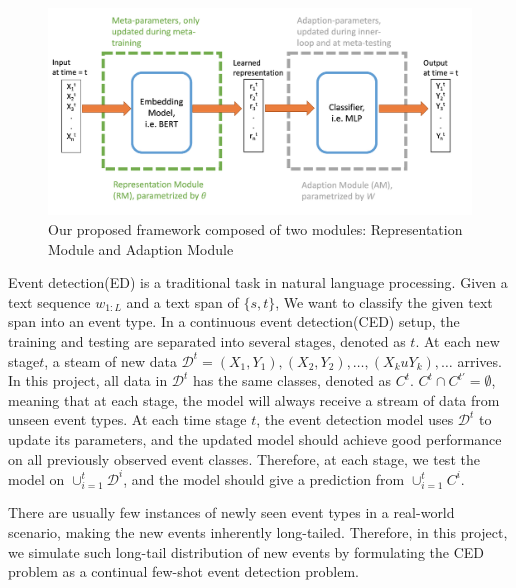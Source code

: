 
\begin{figure}[ht]
\centering
    \includegraphics[scale=0.6]{imgs/framework.jpg}
    \caption{Our proposed framework composed of two modules: Representation Module and Adaption Module}
    \label{img:1}
\end{figure}

Event detection(ED) is a traditional task in natural language processing. Given a text sequence $w_{1:L}$ and a text span of $\{s, t\}$, We want to classify the given text span into an event type.  In a continuous event detection(CED) setup, the training and testing are separated into several stages, denoted as $t$. At each new stage$t$,   a steam of new data $\mathcal{D}^t = (X_1, Y_1), (X_2, Y_2), \dots, (X_ku Y_k), \dots$ arrives.  In this project, all data in $\mathcal{D}^t $ has the same classes, denoted as $C^{t}$.  $C^t \cap C^{t'}  = \emptyset$, meaning that at each stage,  the model will always receive a stream of data from unseen event types.  At each time stage $t$, the event detection model uses $\mathcal{D}^t $ to update its parameters, and the updated model should achieve good performance on all previously observed event classes.  Therefore, at each stage, we test the model on $\cup_{i=1}^t \mathcal{D}^i$, and the model should give a prediction from  $\cup_{i=1}^t C^i$. 

There are usually few instances of newly seen event types in a real-world scenario, making the new events inherently long-tailed. Therefore, in this project, we simulate such long-tail distribution of new events by formulating the CED problem as a continual few-shot event detection problem. 


